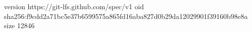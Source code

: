 version https://git-lfs.github.com/spec/v1
oid sha256:f9cdd2a71bc5e37b6599575a865fd16aba827d0b29da12029901f39160b98e8a
size 12846
